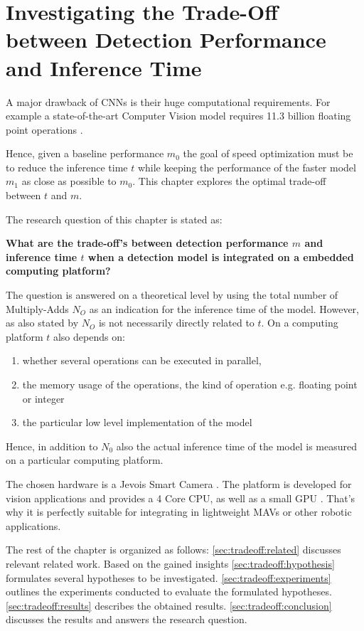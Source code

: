 \chapter{Investigating the Trade-Off between Detection Performance and Inference Time}
\label{sec:tradeoff}

A major drawback of \acp{CNN} is their huge computational requirements. For example a state-of-the-art Computer Vision model \cite{He2015} requires 11.3 billion floating point operations \cite{Tschannen2017}. 

Hence, given a baseline performance $m_0$ the goal of speed optimization must be to reduce the inference time $t$ while keeping the performance of the faster model $m_1$ as close as possible to $m_0$. This chapter explores the optimal trade-off between $t$ and $m$.


The research question of this chapter is stated as:

\begin{center}
	\textbf{What are the trade-off's between detection performance $m$ and inference time $t$ when a detection model is integrated on a embedded computing platform?}
\end{center}

The question is answered on a theoretical level by using the total number of \ac{Multiply-Adds} $N_O$ as an indication for the inference time of the model. However, as also stated by  $N_O$ is not necessarily directly related to $t$. On a computing platform $t$ also depends on:

\begin{enumerate}
	\item whether several operations can be executed in parallel,
	\item the memory usage of the operations, the kind of operation e.g. floating point or integer
	\item the particular low level implementation of the model
\end{enumerate} 

Hence, in addition to $N_0$ also the actual inference time of the model is measured on a particular computing platform.

The chosen hardware is a Jevois Smart Camera . The platform is developed for vision applications and provides a 4 Core CPU, as well as a small GPU . That's why it is perfectly suitable for integrating in lightweight \acp{MAV} or other robotic applications.

The rest of the chapter is organized as follows: \autoref{sec:tradeoff:related} discusses relevant related work. Based on the gained insights \autoref{sec:tradeoff:hypothesis} formulates several hypotheses to be investigated. \autoref{sec:tradeoff:experiments} outlines the experiments conducted to evaluate the formulated hypotheses. \autoref{sec:tradeoff:results} describes the obtained results. \autoref{sec:tradeoff:conclusion} discusses the results and answers the research question.


